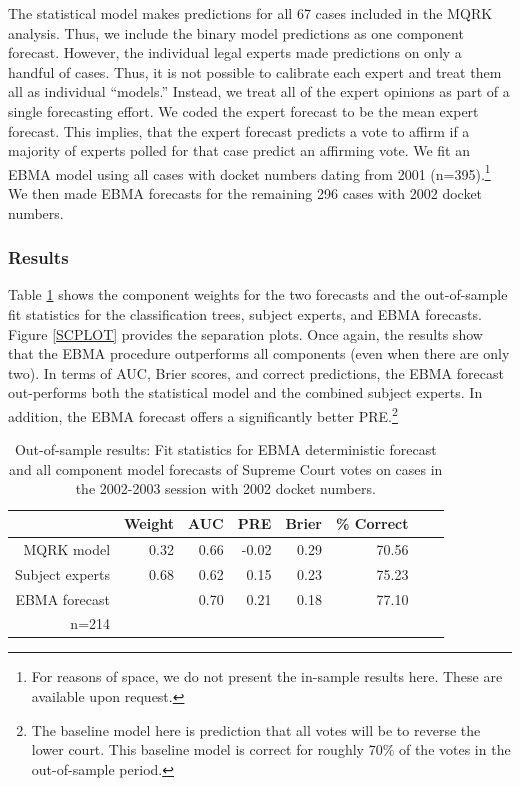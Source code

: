 \documentclass[pdftex,12pt,fullpage,oneside]{amsart}
\begin{document}
The statistical model makes predictions for all 67 cases included in
the MQRK analysis.  Thus, we include the binary model predictions as
one component forecast. However, the individual legal experts made
predictions on only a handful of cases.  Thus, it is not possible to
calibrate each expert and treat them all as individual ``models.''
Instead, we treat all of the expert opinions as part of a single
forecasting effort.  We coded the expert forecast to be the mean
expert forecast. This implies, that the expert forecast predicts a
vote to affirm if a majority of experts polled for that case predict
an affirming vote.  We fit an EBMA model using all cases with docket
numbers dating from 2001 (n=395).\footnote{For reasons of space, we do
  not present the in-sample results here.  These are available upon
  request.}  We then made EBMA forecasts for the remaining 296 cases
with 2002 docket numbers.

 \subsubsection{Results}

 Table \ref{SC-Res} shows the component weights for the two forecasts
 and the out-of-sample fit statistics for the classification trees,
 subject experts, and EBMA forecasts.  Figure \ref{SCPLOT} provides
 the separation plots.  Once again, the results show that the
 EBMA procedure outperforms all components (even when there are only
 two).  In terms of AUC, Brier scores, and correct predictions, the
 EBMA forecast out-performs both the statistical model and the
 combined subject experts.  In addition, the EBMA forecast offers a
 significantly better PRE.\footnote{The baseline model here is
   prediction that all votes will be to reverse the lower court.  This
   baseline model is correct for roughly 70\% of the votes in the
   out-of-sample period.}

\begin{table}[ht]
\caption{\footnotesize Out-of-sample results: Fit statistics for EBMA deterministic
  forecast and all component model forecasts of Supreme Court votes on
cases in the 2002-2003 session with 2002 docket numbers.  }
\label{SC-Res}
\begin{center}
\begin{tabular}{rrrrrrrr}
  \hline
 & Weight & AUC & PRE & Brier & \% Correct \\ 
  \hline
MQRK model& 0.32  & 0.66 & -0.02 & 0.29 & 70.56 \\ 
Subject experts & 0.68 & 0.62 & 0.15 & 0.23 & 75.23 \\ 
EBMA forecast&  & 0.70 & 0.21 & 0.18 & 77.10 \\ 
   \hline
n=214 \\
\end{tabular}
\end{center}
\end{table}
\end{document}
